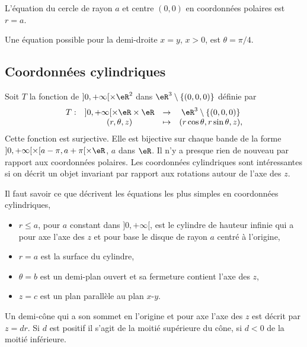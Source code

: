 \begin{example}
L'équation du cercle de rayon $a$ et centre $(0, 0)$ en coordonnées polaires est $r=a$. 
\end{example}

\begin{example}
	Une équation possible pour la demi-droite $x=y$, $x>0$,  est $\theta=\pi/4$.         
\end{example}

\subsection{Coordonnées cylindriques}
Soit $T$ la fonction de $]0, +\infty[\times \eR^2$ dans $\eR^3\setminus\{(0,0,0)\}$ définie par
\begin{equation}
  \begin{array}{lccc}
    T: &]0, +\infty[\times \eR\times \eR & \to & \eR^3\setminus\{(0,0,0)\}\\
 & (r, \theta, z)&\mapsto& (r\cos \theta, r \sin \theta, z),
  \end{array}
\end{equation}
Cette fonction est surjective. Elle est bijective sur chaque bande de la forme  $]0, +\infty[\times [a-\pi,a+\pi[\times \eR$, $a$ dans $\eR$. Il n'y a presque rien de nouveau par rapport aux coordonnées polaires. Les coordonnées  cylindriques sont intéressantes si on décrit un objet invariant par rapport aux rotations autour de l'axe des $z$. 

\begin{example}
Il faut savoir ce que décrivent les équations les plus simples en coordonnées cylindriques, 
\begin{itemize}
\item $r\leq a$, pour $a$ constant dans  $]0, +\infty[$, est le cylindre de hauteur infinie qui a pour axe l'axe des $z$ et pour base le disque de rayon $a$ centré à l'origine, 
\item $r= a$ est  la surface du cylindre,
\item $\theta = b$ est un demi-plan ouvert et sa fermeture contient l'axe des $z$,
\item $z=c$ est un plan parallèle au plan $x$-$y$. 
\end{itemize}
\end{example}

\begin{example}
  Un demi-cône qui a  son sommet en l'origine et  pour axe l'axe des $z$ est décrit par $z=d r$.  Si $d$ est positif  il s'agit  de la moitié supérieure du cône, si $d<0$ de la moitié inférieure.
\end{example}

